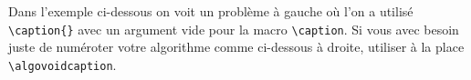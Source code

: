Dans l'exemple ci-dessous on voit un problème à gauche où l'on a utilisé \verb+\caption{}+ avec un argument vide pour la macro \verb+\caption+.
Si vous avec besoin juste de numéroter votre algorithme comme ci-dessous à droite, utiliser à la place \verb+\algovoidcaption+.


\begin{multicols}{2}    
\begin{algo}
    \caption{}

    \Result{\dots}
    \Actions{
        \dots\phantom{X}
        \\
        \phantom{\dots}\vspace{-.75em}
    }
\end{algo}


\begin{algo}
    \algovoidcaption

    \Datas{\dots}
    \Result{\dots}
    \Actions{
        \dots\phantom{X}
        \\
        \phantom{\dots}\vspace{-.75em}
    }
\end{algo}
\end{multicols}


